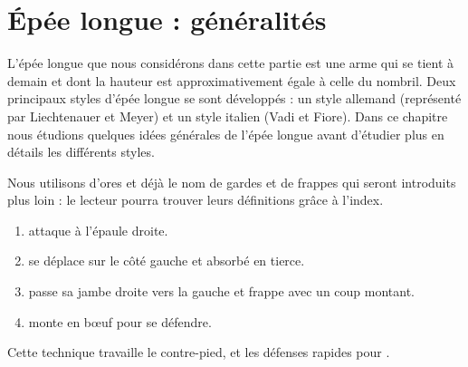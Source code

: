 \chapter{Épée longue : généralités}


L'épée longue que nous considérons dans cette partie est une arme qui se tient à demain et dont la hauteur est approximativement égale à celle du nombril.
Deux principaux styles d'épée longue se sont développés : un style allemand (représenté par Liechtenauer et Meyer) et un style italien (Vadi et Fiore).
Dans ce chapitre nous étudions quelques idées générales de l'épée longue avant d'étudier plus en détails les différents styles.

Nous utilisons d'ores et déjà le nom de gardes et de frappes qui seront introduits plus loin : le lecteur pourra trouver leurs définitions grâce à l'index.

\begin{technique}

\begin{enumerate}
	\item \A attaque à l'épaule droite.
	
	\item \D se déplace sur le côté gauche et absorbé en tierce.
	
	\item \D passe sa jambe droite vers la gauche et frappe \A avec un coup montant.
	
	\item \A monte en bœuf pour se défendre.
\end{enumerate}

Cette technique travaille le contre-pied, et les défenses rapides pour \A.

\end{technique}


